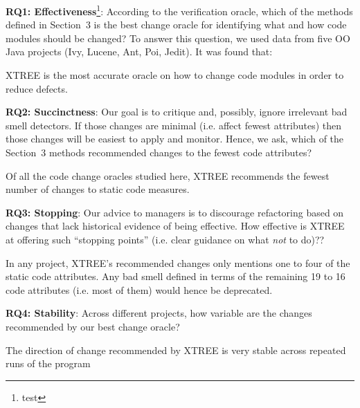 \documentclass[twocolumn,5p]{elsarticle}
\theoremstyle{break}
\begin{document}
 {\bf  RQ1: Effectiveness}\footnote{test}: According to the verification oracle, which of the methods  defined in Section~3 is the best  change oracle for identifying what and how
  code modules should be changed? To answer this question, we used data from five OO Java projects
  (Ivy, Lucene, Ant, Poi, Jedit). It was found that:
  \begin{lesson}
 XTREE is the most accurate oracle on how to change code modules in order to reduce defects.
  \end{lesson}

 {\bf RQ2: Succinctness}: Our goal is to critique and, possibly,
ignore irrelevant bad smell detectors.  If those changes are minimal (i.e. affect fewest attributes) then those changes
will be easiest to apply and monitor. Hence, we ask, which of the Section~3 methods recommended changes to the fewest
code attributes?
\begin{lesson}
Of all the code change oracles studied here, XTREE recommends the fewest number of changes to static code measures.
\end{lesson}

 {\bf RQ3: Stopping}: Our advice to managers is to discourage refactoring based on changes that lack
historical evidence of being effective. How effective is XTREE at offering such ``stopping points'' (i.e. clear guidance on what {\em not} to do)??
\begin{lesson}
In  any  project,  XTREE's  recommended  changes  only  mentions one to four 
of the  static code attributes.  Any bad smell defined in terms of the remaining 19 to 16 code attributes (i.e. most of them)
would hence be deprecated.
\end{lesson}

 {\bf RQ4: Stability}: Across different projects, how variable are the changes recommended by our best change oracle?
\begin{lesson}
The direction of change recommended by XTREE is  very stable across repeated runs of the program 
\end{lesson} 
\end{document}
